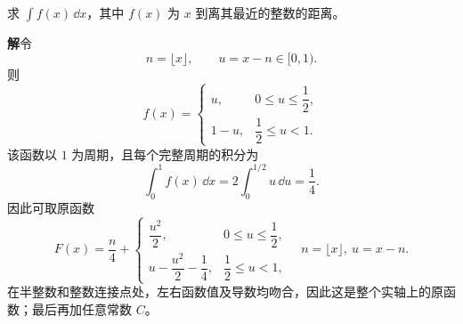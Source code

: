 \begin{xreferenceproblem}[6]
求 $\int f(x)\,\dd x$，其中 $f(x)$ 为 $x$ 到离其最近的整数的距离。
\end{xreferenceproblem}
\begin{xsolution}
\textbf{解}\quad 令
  \[
    n=\lfloor x\rfloor,
    \qquad
    u=x-n\in[0,1).
  \]
  则
  \[
    f(x)=
    \begin{cases}
      u,&0\le u\le\dfrac12,\\[2mm]
      1-u,&\dfrac12\le u<1.
    \end{cases}
  \]
  该函数以 $1$ 为周期，且每个完整周期的积分为
  \[
    \int_0^1f(x)\,\dd x
    =2\int_0^{1/2}u\,\dd u=\frac14.
  \]
  因此可取原函数
  \[
    \boxed{
    F(x)=\frac n4+
    \begin{cases}
      \dfrac{u^2}{2},&0\le u\le\dfrac12,\\[2mm]
      u-\dfrac{u^2}{2}-\dfrac14,&\dfrac12\le u<1,
    \end{cases}
    \quad n=\lfloor x\rfloor,\ u=x-n}.
  \]
  在半整数和整数连接点处，左右函数值及导数均吻合，因此这是整个实轴上的原函数；最后再加任意常数 $C$。
\end{xsolution}


